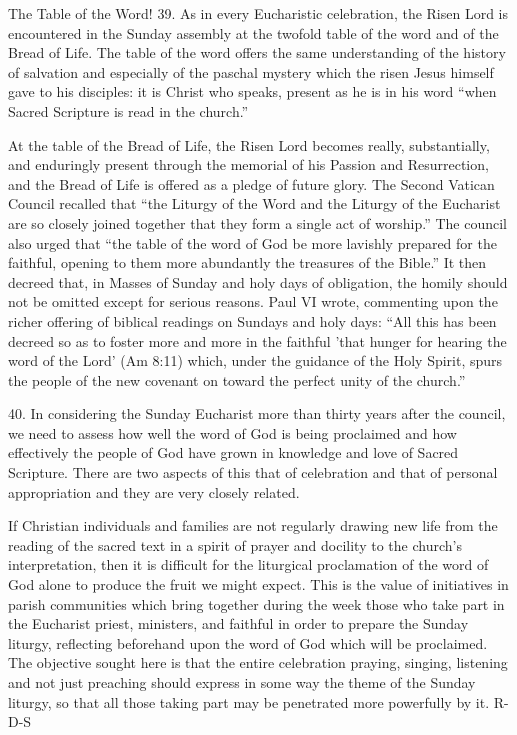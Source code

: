 \documentclass[oneside]{book}
\begin{document}
The Table of the Word!
39. As in every Eucharistic celebration, the Risen Lord is encountered in the
Sunday assembly at the twofold table of the word and of the Bread of Life. The
table of the word offers the same understanding of the history of salvation and
especially of the paschal mystery which the risen Jesus himself gave to his
disciples: it is Christ who speaks, present as he is in his word ``when Sacred
Scripture is read in the church.''

At the table of the Bread of Life, the Risen Lord becomes really, substantially,
and enduringly present through the memorial of his Passion and Resurrection, and
the Bread of Life is offered as a pledge of future glory. The Second Vatican
Council recalled that ``the Liturgy of the Word and the Liturgy of the Eucharist
are so closely joined together that they form a single act of worship.'' The
council also urged that ``the table of the word of God be more lavishly prepared
for the faithful, opening to them more abundantly the treasures of the Bible.''
It then decreed that, in Masses of Sunday and holy days of obligation, the
homily should not be omitted except for serious reasons. Paul VI wrote,
commenting upon the richer offering of biblical readings on Sundays and holy
days: ``All this has been decreed so as to foster more and more in the faithful
'that hunger for hearing the word of the Lord' (Am 8:11) which, under the
guidance of the Holy Spirit, spurs the people of the new covenant on toward the
perfect unity of the church.''

40. In considering the Sunday Eucharist more than thirty years after the
council, we need to assess how well the word of God is being proclaimed and how
effectively the people of God have grown in knowledge and love of Sacred
Scripture. There are two aspects of this  that of celebration and that of
personal appropriation  and they are very closely related.

If Christian individuals and families are not regularly drawing new life from
the reading of the sacred text in a spirit of prayer and docility to the
church's interpretation, then it is difficult for the liturgical proclamation of
the word of God alone to produce the fruit we might expect. This is the value of
initiatives in parish communities which bring together during the week those who
take part in the Eucharist  priest, ministers, and faithful  in order to prepare
the Sunday liturgy, reflecting beforehand upon the word of God which will be
proclaimed. The objective sought here is that the entire celebration  praying,
singing, listening and not just preaching  should express in some way the theme
of the Sunday liturgy, so that all those taking part may be penetrated more
powerfully by it.
R-D-S
\end{document}
